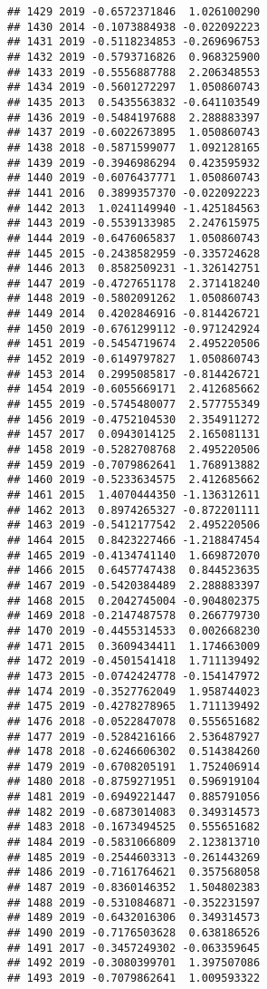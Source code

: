 \documentclass[
]{article}
\begin{document}
\begin{verbatim}
## 1429 2019 -0.6572371846  1.026100290
## 1430 2014 -0.1073884938 -0.022092223
## 1431 2019 -0.5118234853 -0.269696753
## 1432 2019 -0.5793716826  0.968325900
## 1433 2019 -0.5556887788  2.206348553
## 1434 2019 -0.5601272297  1.050860743
## 1435 2013  0.5435563832 -0.641103549
## 1436 2019 -0.5484197688  2.288883397
## 1437 2019 -0.6022673895  1.050860743
## 1438 2018 -0.5871599077  1.092128165
## 1439 2019 -0.3946986294  0.423595932
## 1440 2019 -0.6076437771  1.050860743
## 1441 2016  0.3899357370 -0.022092223
## 1442 2013  1.0241149940 -1.425184563
## 1443 2019 -0.5539133985  2.247615975
## 1444 2019 -0.6476065837  1.050860743
## 1445 2015 -0.2438582959 -0.335724628
## 1446 2013  0.8582509231 -1.326142751
## 1447 2019 -0.4727651178  2.371418240
## 1448 2019 -0.5802091262  1.050860743
## 1449 2014  0.4202846916 -0.814426721
## 1450 2019 -0.6761299112 -0.971242924
## 1451 2019 -0.5454719674  2.495220506
## 1452 2019 -0.6149797827  1.050860743
## 1453 2014  0.2995085817 -0.814426721
## 1454 2019 -0.6055669171  2.412685662
## 1455 2019 -0.5745480077  2.577755349
## 1456 2019 -0.4752104530  2.354911272
## 1457 2017  0.0943014125  2.165081131
## 1458 2019 -0.5282708768  2.495220506
## 1459 2019 -0.7079862641  1.768913882
## 1460 2019 -0.5233634575  2.412685662
## 1461 2015  1.4070444350 -1.136312611
## 1462 2013  0.8974265327 -0.872201111
## 1463 2019 -0.5412177542  2.495220506
## 1464 2015  0.8423227466 -1.218847454
## 1465 2019 -0.4134741140  1.669872070
## 1466 2015  0.6457747438  0.844523635
## 1467 2019 -0.5420384489  2.288883397
## 1468 2015  0.2042745004 -0.904802375
## 1469 2018 -0.2147487578  0.266779730
## 1470 2019 -0.4455314533  0.002668230
## 1471 2015  0.3609434411  1.174663009
## 1472 2019 -0.4501541418  1.711139492
## 1473 2015 -0.0742424778 -0.154147972
## 1474 2019 -0.3527762049  1.958744023
## 1475 2019 -0.4278278965  1.711139492
## 1476 2018 -0.0522847078  0.555651682
## 1477 2019 -0.5284216166  2.536487927
## 1478 2018 -0.6246606302  0.514384260
## 1479 2019 -0.6708205191  1.752406914
## 1480 2018 -0.8759271951  0.596919104
## 1481 2019 -0.6949221447  0.885791056
## 1482 2019 -0.6873014083  0.349314573
## 1483 2018 -0.1673494525  0.555651682
## 1484 2019 -0.5831066809  2.123813710
## 1485 2019 -0.2544603313 -0.261443269
## 1486 2019 -0.7161764621  0.357568058
## 1487 2019 -0.8360146352  1.504802383
## 1488 2019 -0.5310846871 -0.352231597
## 1489 2019 -0.6432016306  0.349314573
## 1490 2019 -0.7176503628  0.638186526
## 1491 2017 -0.3457249302 -0.063359645
## 1492 2019 -0.3080399701  1.397507086
## 1493 2019 -0.7079862641  1.009593322

\end{verbatim}
\end{document}
